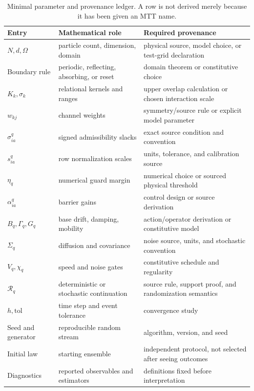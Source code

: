 \documentclass[11pt]{article}
\theoremstyle{definition}
\theoremstyle{remark}
\newcommand{\cR}{\mathcal R}
\begin{document}
\begin{table}[p]
\centering
\small
\begin{tabularx}{\textwidth}{L{0.22\textwidth}L{0.25\textwidth}Y}
\toprule
Entry & Mathematical role & Required provenance \\
\midrule
$N,d,\Omega$
  & particle count, dimension, domain
  & physical source, model choice, or test-grid declaration \\
Boundary rule
  & periodic, reflecting, absorbing, or reset
  & domain theorem or constitutive choice \\
$K_k,\sigma_k$
  & relational kernels and ranges
  & upper overlap calculation or chosen interaction scale \\
$w_{kj}$
  & channel weights
  & symmetry/source rule or explicit model parameter \\
$\sigma_{ia}^{q}$
  & signed admissibility slacks
  & exact source condition and convention \\
$s_{ia}^{q}$
  & row normalization scales
  & units, tolerance, and calibration source \\
$\eta_q$
  & numerical guard margin
  & numerical choice or sourced physical threshold \\
$\alpha_{ia}^{q}$
  & barrier gains
  & control design or source derivation \\
$B_q,\Gamma_q,G_q$
  & base drift, damping, mobility
  & action/operator derivation or constitutive model \\
$\Sigma_q$
  & diffusion and covariance
  & noise source, units, and stochastic convention \\
$V_q,\chi_q$
  & speed and noise gates
  & constitutive schedule and regularity \\
$\cR_q$
  & deterministic or stochastic continuation
  & source rule, support proof, and randomization semantics \\
$h,\mathrm{tol}$
  & time step and event tolerance
  & convergence study \\
Seed and generator
  & reproducible random stream
  & algorithm, version, and seed \\
Initial law
  & starting ensemble
  & independent protocol, not selected after seeing outcomes \\
Diagnostics
  & reported observables and estimators
  & definitions fixed before interpretation \\
\bottomrule
\end{tabularx}
\caption{Minimal parameter and provenance ledger.  A row is not derived
merely because it has been given an MTT name.}
\label{tab:ledger}
\end{table}
\end{document}
